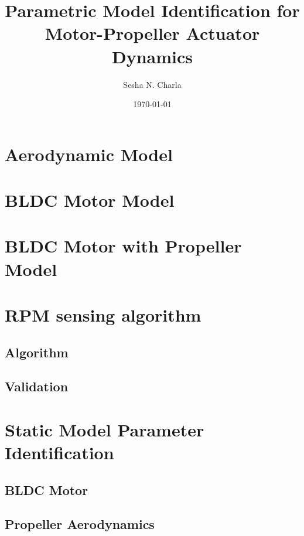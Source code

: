 \documentclass[letterpaper, 11pt]{article}
\title{Parametric Model Identification for Motor-Propeller Actuator Dynamics}
\author{Sesha N. Charla}
\date{\today}
\begin{document}
\maketitle
\tableofcontents

\newpage
\section{Aerodynamic Model}

\newpage
\section{BLDC Motor Model}



\newpage


\section{BLDC Motor with Propeller Model}
\newpage


\section{RPM sensing algorithm}
\subsection{Algorithm}
\subsection{Validation}
\newpage


\section{Static Model Parameter Identification}
\subsection{BLDC Motor}
\subsection{Propeller Aerodynamics}
\newpage
\end{document}
